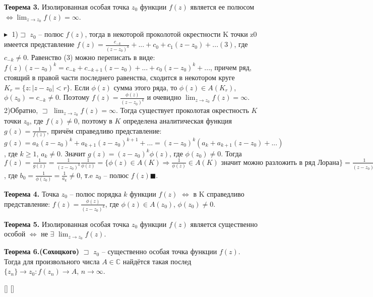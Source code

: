 \textbf{Теорема 3.} Изолированная особая точка $z_0$ функции $f(z)$ является ее полюсом $\Longleftrightarrow \displaystyle\lim_{z\rightarrow z_0}f(z)=\infty$.

$\blacktriangleright\;$
    1)$\sqsupset$ $z_0$ – полюс $f(z)$, тогда в некоторой проколотой окрестности K точки z0 имеется представление $f(z)=\frac{c_{-k}}{(z-z_0)^k}+...+c_0+c_1(z-z_0)+...(3)$,
    где $c_{-k}\neq0$. Равенство (3) можно переписать в виде:
    $f(z)(z-z_0)^k=c_{-k}+c_{-k+1}(z-z_0)+...+c_0(z-z_0)^k+...$, причем ряд, стоящий в правой части последнего равенства, сходится в некотором круге $K_r=\{z:|z-z_0|<r\}$. Если $\phi(z)$ сумма этого ряда, то $\phi(z) \in A(K_r)$, $\phi(z_0)=c_{-k}\neq0$. Поэтому $f(z)=\frac{\phi(z)}{(z-z_0)^k}$ и очевидно $\displaystyle\lim_{z\rightarrow z_0}f(z)=\infty$.
    2)Обратно, $\sqsupset$ $\displaystyle\lim_{z\rightarrow z_0}f(z)=\infty$. Тогда существует
    проколотая окрестность $K$ точки $z_0$, где $f(z) \neq 0$, поэтому
    в $K$ определена аналитическая функция $g(z) = \frac{1}{f(z)}$, причём справедливо представление: $g(z)=a_k(z-z_0)^k+a_{k+1}(z-z_0)^{k+1}+...=(z-z_0)^k(a_k+a_{k+1}(z-z_0)+...)$, где $k\geq1$, $a_k\neq0$. Значит $g(z)=(z-z_0)^k\phi(z)$, где $\phi(z_0)\neq0$. Тогда $f(z)=\frac{1}{g(z)}=\frac{1}{(z-z_0)^k}\frac{1}{\phi(z)}=\{\phi(z) \in A(K) \Rightarrow \frac{1}{\phi(z)} \in A(K) \text{ значит можно разложить в ряд Лорана}\}=
    \frac{1}{(z-z_0)^k}(b_0+b_1(z-z_0)+...)$, где $b_0=\frac{1}{\phi(z_0)}=\frac{1}{a_k}\neq0$, т.e $z_0$ -- полюс $f(z) \blacksquare$.
    
\textbf{Теорема 4.} Точка $z_0$ – полюс порядка $k$ функции $f(z)$ $\Longleftrightarrow$ в K справедливо представление: $f(z)=\frac{\phi(z)}{(z-z_0)^k}$, где $\phi(z)\in A(z_0)$, $\phi(z_0)\neq 0$.

\textbf{Теорема 5.} Изолированная особая точка $z_0$ функции
 $f(z)$ является существенно особой $\Longleftrightarrow$ не $\exists$ $\displaystyle\lim_{z\rightarrow z_0}f(z)$.

\textbf{Теорема 6.(Сохоцкого)} $\sqsupset$ $z_0$ – существенно особая точка функции $f(z)$. Тогда
для произвольного числа $A \in \mathbb{C}$ найдётся такая послед $\{z_n\}\rightarrow z_0:f(z_n)\rightarrow A$, $n \rightarrow \infty$.


[\cite{tfkp_stud_ticket}]
[\cite{tfkp_msu}]

